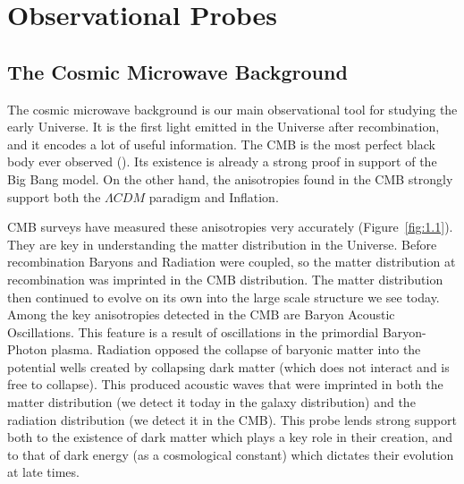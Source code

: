 


\section{Observational Probes}
\subsection{The Cosmic Microwave Background}

The cosmic microwave background is our main observational tool for studying the early Universe. It is the first light emitted in the Universe after recombination, and it encodes a lot of useful information. The CMB is the most perfect black body ever observed (\cite{1999dpf..conf.....W}). Its existence is already a strong proof in support of the Big Bang model. On the other hand, the anisotropies found in the CMB strongly support both the $\Lambda CDM$ paradigm and Inflation.

CMB surveys have measured these anisotropies very accurately (Figure~\ref{fig:1.1}). They are key in understanding the matter distribution in the Universe. Before recombination Baryons and Radiation were coupled, so the matter distribution at recombination was imprinted in the CMB distribution. The matter distribution then continued to evolve on its own into the large scale structure we see today. Among the key anisotropies detected in the CMB are Baryon Acoustic Oscillations. This feature is a result of oscillations in the primordial Baryon-Photon plasma. Radiation opposed the collapse of baryonic matter into the potential wells created by collapsing dark matter (which does not interact and is free to collapse). This produced acoustic waves that were imprinted in both the matter distribution (we detect it today in the galaxy distribution) and the radiation distribution (we detect it in the CMB). This probe lends strong support both to the existence of dark matter which plays a key role in their creation, and to that of dark energy (as a cosmological constant) which dictates their evolution at late times.

